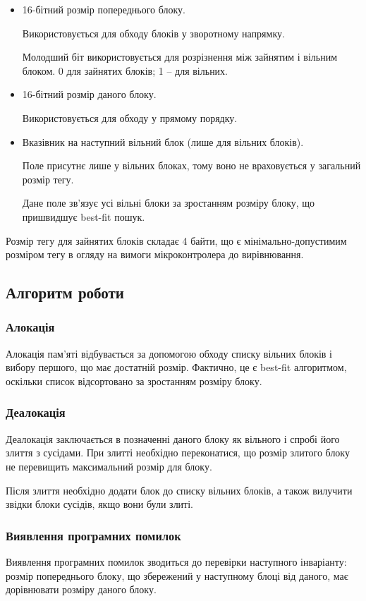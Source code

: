 \documentclass[oneside,14pt,a4paper,final]{myextreport}
\begin{document}
\begin{itemize}
\item 16-бітний розмір попереднього блоку.

  Використовується для обходу блоків у зворотному напрямку.

  Молодший біт використовується для розрізнення між зайнятим і вільним блоком. 0 для зайнятих блоків; 1 -- для вільних.

\item 16-бітний розмір даного блоку.

  Використовується для обходу у прямому порядку.

\item Вказівник на наступний вільний блок (лише для вільних блоків).

  Поле присутнє лише у вільних блоках, тому воно не враховується у загальний розмір тегу.

  Дане поле зв'язує усі вільні блоки за зростанням розміру блоку, що пришвидшує best-fit пошук.
\end{itemize}

Розмір тегу для зайнятих блоків складає 4 байти, що є мінімально-допустимим розміром тегу в огляду на вимоги мікроконтролера до вирівнювання.

\subsection{Алгоритм роботи}

\subsubsection{Алокація}
Алокація пам'яті відбувається за допомогою обходу списку вільних блоків і вибору першого, що має достатній розмір. Фактично, це є best-fit алгоритмом, оскільки список відсортовано за зростанням розміру блоку.

\subsubsection{Деалокація}
Деалокація заключається в позначенні даного блоку як вільного і спробі його злиття з сусідами. При злитті необхідно переконатися, що розмір злитого блоку не перевищить максимальний розмір для блоку.

Після злиття необхідно додати блок до списку вільних блоків, а також вилучити звідки блоки сусідів, якщо вони були злиті.

\subsubsection{Виявлення програмних помилок}
Виявлення програмних помилок зводиться до перевірки наступного інваріанту: розмір попереднього блоку, що збережений у наступному блоці від даного, має дорівнювати розміру даного блоку.
\end{document}
